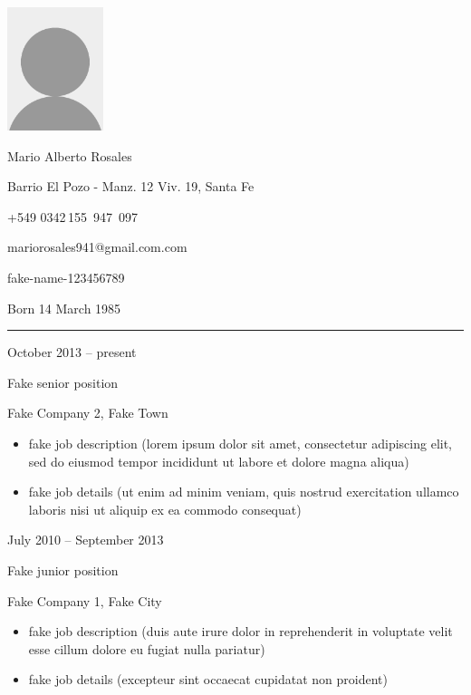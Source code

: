 \documentclass[a4paper,10pt]{article}
\newlength{\cvcolumngapwidth}
\newlength{\cvleftcolumnwidth}
\newlength{\cvrightcolumnwidth}
\newcommand{\cvnamestyle}[1]{{\Large\cvnamefont\textcolor{cvnamecolor}{#1}}}
\newcommand{\cvsectionstyle}[1]{{\normalsize\cvsectionfont\textcolor{cvsectioncolor}{#1}}}
\newcommand{\cvtitlestyle}[1]{{\large\cvtitlefont\textcolor{cvtitlecolor}{#1}}}
\newcommand{\cvdurationstyle}[1]{{\small\cvdurationfont\textcolor{cvdurationcolor}{#1}}}
\newlength{\cvafteritemskipamount}
\newlength{\cvaftersectionskipamount}
\newlength{\cvafternameskipamount}
\newlength{\cvafterpersonalinfolineskipamount}
\newlength{\cvaftertitleskipamount}
\newlength{\cvparskip}
\newcommand{\cvpersonalinfo}[2]{
    \begin{minipage}[t]{\cvleftcolumnwidth}
        \vspace{0mm} %
        \raggedleft #1
    \end{minipage}%
    \hspace{\cvcolumngapwidth}%
    \begin{minipage}[t]{\cvrightcolumnwidth}
        \vspace{0mm} %
        #2
    \end{minipage}

    \vspace{\cvafteritemskipamount}
}
\newcommand{\cvname}[1]{
    \cvnamestyle{#1}

    \vspace{\cvafternameskipamount}
}
\newcommand{\cvpersonalinfolinewithicon}[3]{
    \raisebox{.5\fontcharht\font`E-.5\height}{\texttt{[image: \#2]}}
    #3

    \vspace{\cvafterpersonalinfolineskipamount}
}
\newcommand{\cvsection}[1]{
    \begin{minipage}[t]{\cvleftcolumnwidth}
        \raggedleft\cvsectionstyle{#1}
    \end{minipage}%
    \hspace{\cvcolumngapwidth}%
    \begin{minipage}[t]{\cvrightcolumnwidth}
        \textcolor{cvrulecolor}{\rule{\cvrightcolumnwidth}{0.3mm}}
    \end{minipage}

    \vspace{\cvaftersectionskipamount}
}
\newcommand{\cvitem}[2]{
    \begin{minipage}[t]{\cvleftcolumnwidth}
        \raggedleft #1
    \end{minipage}%
    \hspace{\cvcolumngapwidth}%
    \begin{minipage}[t]{\cvrightcolumnwidth}
        \setlength{\parskip}{\cvparskip} #2
    \end{minipage}

    \vspace{\cvafteritemskipamount}
}
\newcommand{\cvtitle}[1]{
    \cvtitlestyle{#1}

    \vspace{\cvaftertitleskipamount}
    \vspace{-\cvparskip}
}
\begin{document}

\cvpersonalinfo{
    \includegraphics[height=36mm]{photo.png}
}{
    \cvname{Mario Alberto Rosales}

    \cvpersonalinfolinewithicon{height=4mm}{072-location.pdf}{
        Barrio El Pozo - Manz. 12 Viv. 19, Santa Fe
    }

    \cvpersonalinfolinewithicon{height=4mm}{067-phone.pdf}{
        +549 0342\,155\, 947 \,097
    }

    \cvpersonalinfolinewithicon{height=4mm}{070-envelop.pdf}{
        mariorosales941@gmail.com.com
    }

    \cvpersonalinfolinewithicon{height=4mm}{458-linkedin.pdf}{
        fake-name-123456789
    }

    Born 14 March 1985
}



\cvsection{WORK EXPERIENCE}

\cvitem{
    \cvdurationstyle{October 2013 -- present}
}{
    \cvtitle{Fake senior position}

    Fake Company 2, Fake Town

    \begin{itemize}[leftmargin=*]
        \item fake job description (lorem ipsum dolor sit amet, consectetur adipiscing elit, sed do eiusmod tempor
              incididunt ut labore et dolore magna aliqua)
        \item fake job details (ut enim ad minim veniam, quis nostrud exercitation ullamco laboris nisi ut aliquip ex
              ea commodo consequat)
    \end{itemize}
}

\cvitem{
    \cvdurationstyle{July 2010 -- September 2013}
}{
    \cvtitle{Fake junior position}

    Fake Company 1, Fake City

    \begin{itemize}[leftmargin=*]
        \item fake job description (duis aute irure dolor in reprehenderit in voluptate velit esse cillum dolore eu
              fugiat nulla pariatur)
        \item fake job details (excepteur sint occaecat cupidatat non proident)
    \end{itemize}
}
\end{document}
